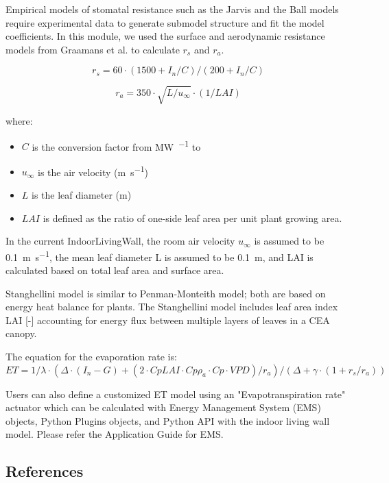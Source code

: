 Empirical models of stomatal resistance such as the Jarvis and the Ball models require experimental data to generate submodel structure and fit the model coefficients.  In this module, we used the surface and aerodynamic resistance models from Graamans et al. to calculate $r_s$ and $r_a$.

\begin{equation}
r_s=60 \cdot (1500+I_n/C)/(200+I_n/C)
\end{equation}

\begin{equation}
r_a=350 \cdot \sqrt{L/u_\infty} \cdot (1/LAI)
\end{equation}

where:

\begin{itemize}
\tightlist
\item
  \(C\) is the conversion factor from \si{\mega\watt\per\area} to \si{\umolperAreaperSecond}
\item
  \(u_\infty\) is the air velocity (\si{\m\per\s})
\item
  \(L\) is the leaf diameter (\si{\m})
\item
  \(LAI\) is defined as the ratio of one-side leaf area per unit plant growing area.
\end{itemize}

In the current IndoorLivingWall, the room air velocity \(u_\infty\) is assumed to be \SI{0.1}{\m\per\s}, the mean leaf diameter L is assumed to be \SI{0.1}{\m}, and LAI is calculated based on total leaf area and surface area.

Stanghellini model is similar to Penman-Monteith model; both are based on energy heat balance for plants. The Stanghellini model includes leaf area index LAI [-] accounting for energy flux between multiple layers of leaves in a CEA canopy.

The equation for the evaporation rate is:
\begin{equation}
ET=1/\lambda \cdot (\Delta \cdot(I_n-G)+(2 \cdot Cp LAI \cdot Cp \rho_a \cdot Cp \cdot VPD)/r_a )/(\Delta+\gamma \cdot (1+r_s/r_a ) )
\end{equation}

Users can also define a customized ET model using an "Evapotranspiration rate" actuator which can be calculated with Energy Management System (EMS) objects, Python Plugins objects, and Python API with the indoor living wall model. Please refer the Application Guide for EMS.

\subsection{References}\label{references-indoorlivingwall}

